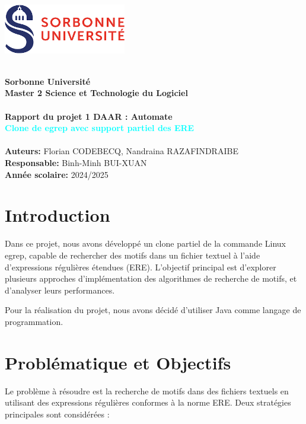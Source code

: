\documentclass{article}
\begin{document}
\begin{titlepage}
    \centering
    \includegraphics[width=0.4\textwidth]{ressources/logoSorbonne.png}
    \begin{center}
        \hrulefill \\[1cm]
        \Huge\textbf{Sorbonne Université} \\[1cm]
        \Large\textbf{Master 2 Science et Technologie du Logiciel} \\ [1cm]
        \hrulefill \\[2cm]
        \huge\textbf{Rapport du projet 1 DAAR : Automate } \\[1cm]
        \huge\textbf{\textcolor{cyan}{Clone de egrep avec support partiel des ERE}} \\[2cm]
        \hrulefill \\[2.5cm]
        \Large\textbf{Auteurs:} Florian CODEBECQ, Nandraina RAZAFINDRAIBE\\[1cm] 
        \Large\textbf{Responsable:} Binh-Minh BUI-XUAN\\[2.5cm]
        \textbf{Année scolaire:} 2024/2025  
    \end{center}
\end{titlepage}

\newpage

\tableofcontents

\newpage

\setcounter{page}{1}

\setcounter{section}{0}
\section{Introduction}
Dans ce projet, nous avons développé un clone partiel de la commande Linux egrep, capable de rechercher des motifs dans un fichier textuel à l'aide d'expressions régulières étendues (ERE). L'objectif principal est d'explorer plusieurs approches d'implémentation des algorithmes de recherche de motifs, et d'analyser leurs performances.

Pour la réalisation du projet, nous avons décidé d'utiliser Java comme langage de programmation.

\section{Problématique et Objectifs}
Le problème à résoudre est la recherche de motifs dans des fichiers textuels en utilisant des expressions régulières conformes à la norme ERE. Deux stratégies principales sont considérées :
\end{document}
